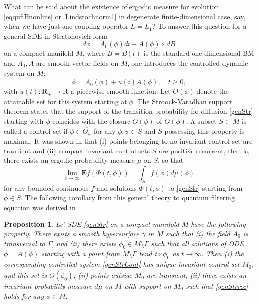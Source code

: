 \documentclass[12pt]{article}
\def\E{\mathbf{E}}
\def\R{\mathbf{R}}
\def\ga{\gamma}
\newtheorem{prop}{Proposition}[section]
\newcommand{\Ga}{\Gamma}
\begin{document}
What can be said about the existence of ergodic measure for
evolution \eqref{eqqufiBnonlins}
or \eqref{Lindstochnorm1} in degenerate finite-dimensional case, say,
when we have just one coupling operator $L=L_1$?
To answer this question for a general SDE in Stratonovich form
\begin{equation}
\label{genStr}
d\phi =A_0(\phi) dt +A(\phi) \circ \, dB
\end{equation}
on a compact manifold $M$,
where $B=B(t)$ is the standard one-dimensional BM and $A_0, A$ are smooth vector fields on $M$,
one introduces
the controlled dynamic system on $M$:
\begin{equation}
\label{genStrCont}
\dot \phi =A_0(\phi) +u(t) A(\phi), \quad t\ge 0,
\end{equation}
with $u(t):\R_+\to \R$ a piecewise smooth function. Let $O(\phi)$ denote the attainable set for this system
starting at $\phi$. The Stroock-Varadhan support theorem states that the support of the transition probability
for diffusion \eqref{genStr} starting with $\phi$ coincides with the closure $\overline{O(\phi)}$ of $O(\phi)$.
A subset $S\subset M$ is called a control set if $\phi \in \overline{O_{\psi}}$ for any $\phi,\psi\in S$ and $S$
possessing this property is maximal. It was shown in \cite{Klieman} that (i) points belonging to no invariant
control set are transient and (ii) compact invariant control sets $S$
are positive recurrent, that is, there exists an ergodic probability measure $\mu$ on $S$, so that
\begin{equation}
\label{genStrrec}
\lim_{t\to \infty} \E f(\Phi(t,\phi))=\int_S f(\phi) d\mu (\phi)
\end{equation}
for any bounded continuous $f$ and solutions $\Phi(t,\phi)$ to \eqref{genStr} starting from $\phi\in S$.
The following corollary from this general theory to quantum filtering equation
was derived in \cite{Kol93}.

\begin{prop}
Let SDE \eqref{genStr} on a compact manifold $M$ have the following property.
There exists a smooth hypersurface $\ga$ in $M$ such that (i) the field $A_0$
is transversal to $\Ga$, and (ii) there exists $\phi_0\in M\setminus \Ga$ such that
all solutions of ODE $\dot \phi =A(\phi)$ starting with a point from $M\setminus \Ga$
tend to $\phi_0$ as $t\to \infty$. Then
(i) the corresponding controlled system
\eqref{genStrCont} has unique invariant control set $M_0$, and this set is $\overline{O(\phi_0)}$;
(ii) points outside $M_0$ are transient;
(ii) there exists an invariant probability measure $d\mu$ on $M$ with support on $M_0$ such that
\eqref{genStrrec} holds for any $\phi\in M$.
\end{prop}
\end{document}
